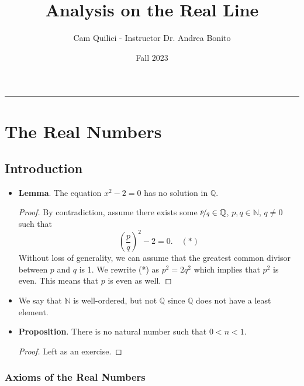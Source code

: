 \documentclass{article}
\title{Analysis on the Real Line}
\author{Cam Quilici - Instructor Dr. Andrea Bonito}
\date{Fall 2023}
\newcommand{\Q}{\mathbb{Q}}
\newcommand{\N}{\mathbb{N}}
\newcommand{\?}{\stackrel{?}{=}}
\begin{document}
\maketitle

\vspace{-0.3in}
\noindent
\rule{\linewidth}{0.4pt}

\tableofcontents

\newpage

\section{The Real Numbers}

\subsection{Introduction}

\begin{itemize}
    \item \textbf{Lemma}. The equation $x^2 - 2 = 0$ has no solution in $\Q$.
    \begin{proof}
        By contradiction, assume there exists some $\nicefrac{p}{q} \in \Q$, $p, q \in \N$, $q \neq 0$ such that
        $$\left(\frac{p}{q}\right)^2 - 2 = 0. \quad (*)$$
        Without loss of generality, we can assume that the greatest common divisor between $p$ and $q$ is 1. We rewrite (*) as $p^2 = 2q^2$ which implies that $p^2$ is even. This means that $p$ is even as well.
    \end{proof}
    \item We say that $\N$ is well-ordered, but not $\Q$ since $\Q$ does not have a least element.
    \item \textbf{Proposition}. There is no natural number such that $0 < n < 1$.
    \begin{proof}
        Left as an exercise.
    \end{proof}
\end{itemize}

\subsubsection{Axioms of the Real Numbers}
\end{document}
